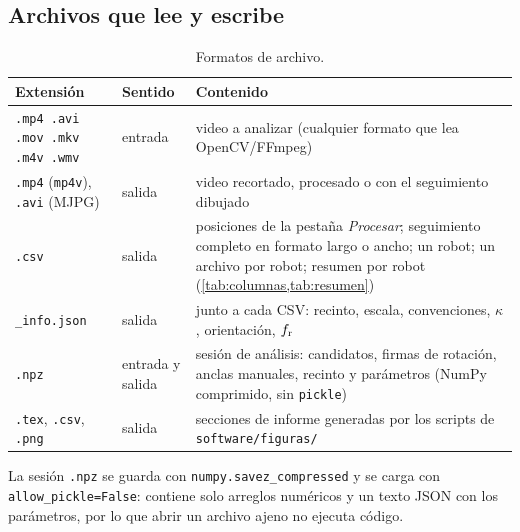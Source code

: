 \subsection{Archivos que lee y escribe}

\begin{table}[H]
  \centering
  \caption{Formatos de archivo.}
  \label{tab:formatos}
  \small
  \begin{tabular}{@{}p{3.3cm}lp{8.6cm}@{}}
    \toprule
    Extensión & Sentido & Contenido \\
    \midrule
    \texttt{.mp4 .avi .mov .mkv .m4v .wmv} & entrada & video a analizar (cualquier formato que lea OpenCV/FFmpeg) \\
    \texttt{.mp4} (\texttt{mp4v}), \texttt{.avi} (MJPG) & salida & video recortado, procesado o con el seguimiento dibujado \\
    \texttt{.csv} & salida & posiciones de la pestaña \emph{Procesar}; seguimiento completo en formato largo o ancho;
                            un robot; un archivo por robot; resumen por robot (\cref{tab:columnas,tab:resumen}) \\
    \texttt{\_info.json} & salida & junto a cada CSV: recinto, escala, convenciones, $\kappa$, orientación, $f_{\mathrm{r}}$ \\
    \texttt{.npz} & entrada y salida & sesión de análisis: candidatos, firmas de rotación, anclas manuales,
                                       recinto y parámetros (NumPy comprimido, sin \texttt{pickle}) \\
    \texttt{.tex}, \texttt{.csv}, \texttt{.png} & salida & secciones de informe generadas por los scripts de \texttt{software/figuras/} \\
    \bottomrule
  \end{tabular}
\end{table}

La sesión \texttt{.npz} se guarda con \texttt{numpy.savez\_compressed} y se carga con
\texttt{allow\_pickle=False}: contiene solo arreglos numéricos y un texto JSON con los parámetros,
por lo que abrir un archivo ajeno no ejecuta código.

